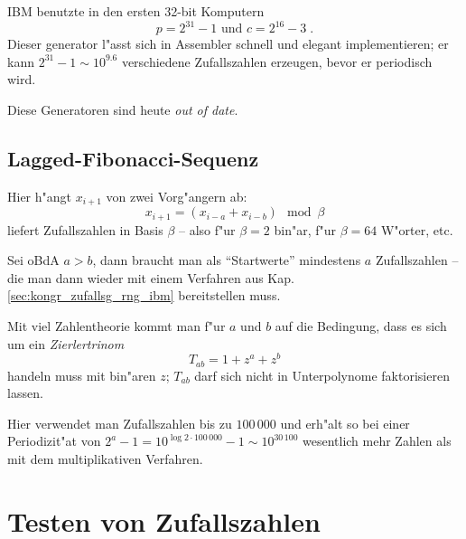 \documentclass[a4paper]{book}
\begin{document}
IBM benutzte in den ersten 32-bit Komputern
\begin{equation*}
  p = 2^{31} -1 \text{ und } c = 2^{16}-3 \;.
\end{equation*}
Dieser generator l"asst sich in Assembler schnell und elegant
implementieren; er kann $2^{31}-1 \sim 10^{9.6}$ verschiedene
Zufallszahlen erzeugen, bevor er periodisch wird.

Diese Generatoren sind heute \emph{out of date}.




\subsection{Lagged-Fibonacci-Sequenz}
\label{sec:lagged_fibonacci_sequenz}

Hier h"angt $x_{i+1}$ von zwei Vorg"angern ab:
\begin{equation}
  \label{eq:90}
  x_{i+1} = (x_{i-a} + x_{i-b}) \mod \beta
\end{equation}
liefert Zufallszahlen in Basis $\beta$ -- also f"ur $\beta=2$ bin"ar, f"ur
$\beta=64$ W"orter, etc.

Sei oBdA $a>b$, dann braucht man als "`Startwerte"' mindestens $a$
Zufallszahlen -- die man dann wieder mit einem Verfahren aus
Kap. \ref{sec:kongr_zufallsg_rng_ibm} bereitstellen muss.

Mit viel Zahlentheorie kommt man f"ur $a$ und $b$ auf die Bedingung,
dass es sich um ein \emph{Zierlertrinom}
\begin{equation*}
  T_{ab} = 1+z^a + z^b
\end{equation*}
handeln muss mit bin"aren $z$; $T_{ab}$ darf sich nicht in
Unterpolynome faktorisieren lassen.

Hier verwendet man Zufallszahlen bis zu $100\, 000$ und erh"alt so bei
einer Periodizit"at von $2^a-1 = 10^{\log 2 \cdot 100\,000}-1 \sim
10^{30\,100}$ wesentlich mehr Zahlen als mit dem multiplikativen
Verfahren.



\section{Testen von Zufallszahlen}
\label{sec:testen_von_zufallszahlen}
\end{document}
